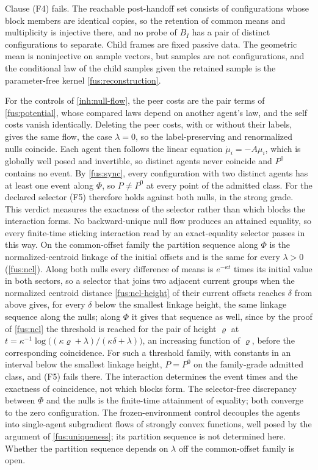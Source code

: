 Clause (F4) fails. The reachable post-handoff set consists of configurations
whose block members are identical copies, so the retention of common means
and multiplicity is injective there, and no probe of $B_I$ has a pair of
distinct configurations to separate. Child frames are fixed passive data.
The geometric mean is noninjective on sample vectors, but samples are not
configurations, and the conditional law of the child samples given the
retained sample is the parameter-free kernel \cref{fus:reconstruction}.

For the controls of \cref{inh:null-flow}, the peer costs are the pair terms
of \cref{fus:potential}, whose compared laws depend on another agent's law,
and the self costs vanish identically. Deleting the peer costs, with or
without their labels, gives the same flow, the case $\lambda=0$, so the
label-preserving and renormalized nulls coincide. Each agent then follows the
linear equation $\dot\mu_i=-A\mu_i$, which is globally well posed and
invertible, so distinct agents never coincide and $P^0$ contains no event.
By \cref{fus:sync}, every configuration with two distinct agents has at
least one event along $\Phi$, so $P\neq P^0$ at every point of the admitted
class. For the declared selector (F5) therefore holds against both nulls,
in the strong grade. This verdict measures the exactness of the selector
rather than which blocks the interaction forms. No backward-unique null flow
produces an attained equality, so every finite-time sticking interaction
read by an exact-equality selector passes in this way. On the common-offset
family the partition sequence along $\Phi$ is the normalized-centroid
linkage of the initial offsets and is the same for every $\lambda>0$
(\cref{fus:ncl}). Along both nulls every difference of means is
$e^{-\kappa t}$ times its initial value in both sectors, so a selector that
joins two adjacent current groups when the normalized centroid distance
\cref{fus:ncl-height} of their current offsets reaches $\delta$ from above
gives, for every $\delta$ below the smallest linkage height, the same
linkage sequence along the nulls; along $\Phi$ it gives that sequence as
well, since by the proof of \cref{fus:ncl} the threshold is reached for the
pair of height $\varrho$ at $t=\kappa^{-1}\log\bigl((\kappa\varrho+\lambda)/(\kappa\delta+\lambda)\bigr)$,
an increasing function of $\varrho$, before the corresponding coincidence.
For such a threshold family, with constants in an interval below the
smallest linkage height, $P=P^0$ on the family-grade admitted class, and
(F5) fails there. The interaction determines the event times and the
exactness of coincidence, not which blocks form. The selector-free
discrepancy between $\Phi$ and the nulls is the finite-time attainment of
equality; both converge to the zero configuration. The frozen-environment
control decouples the agents into single-agent subgradient flows of strongly
convex functions, well posed by the argument of \cref{fus:uniqueness}; its
partition sequence is not determined here. Whether the partition sequence
depends on $\lambda$ off the common-offset family is open.

